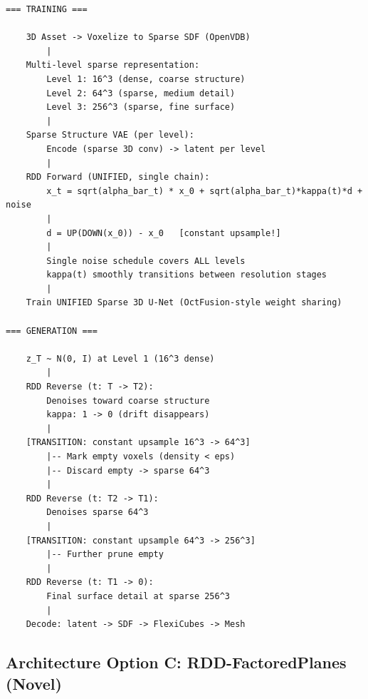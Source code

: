 \documentclass[11pt, a4paper]{article}
\begin{document}
\begin{lstlisting}[style=flowchart, caption={RDD-SparseVoxel Architecture}]
=== TRAINING ===

    3D Asset -> Voxelize to Sparse SDF (OpenVDB)
        |
    Multi-level sparse representation:
        Level 1: 16^3 (dense, coarse structure)
        Level 2: 64^3 (sparse, medium detail)
        Level 3: 256^3 (sparse, fine surface)
        |
    Sparse Structure VAE (per level):
        Encode (sparse 3D conv) -> latent per level
        |
    RDD Forward (UNIFIED, single chain):
        x_t = sqrt(alpha_bar_t) * x_0 + sqrt(alpha_bar_t)*kappa(t)*d + noise
        |
        d = UP(DOWN(x_0)) - x_0   [constant upsample!]
        |
        Single noise schedule covers ALL levels
        kappa(t) smoothly transitions between resolution stages
        |
    Train UNIFIED Sparse 3D U-Net (OctFusion-style weight sharing)

=== GENERATION ===

    z_T ~ N(0, I) at Level 1 (16^3 dense)
        |
    RDD Reverse (t: T -> T2):
        Denoises toward coarse structure
        kappa: 1 -> 0 (drift disappears)
        |
    [TRANSITION: constant upsample 16^3 -> 64^3]
        |-- Mark empty voxels (density < eps)
        |-- Discard empty -> sparse 64^3
        |
    RDD Reverse (t: T2 -> T1):
        Denoises sparse 64^3
        |
    [TRANSITION: constant upsample 64^3 -> 256^3]
        |-- Further prune empty
        |
    RDD Reverse (t: T1 -> 0):
        Final surface detail at sparse 256^3
        |
    Decode: latent -> SDF -> FlexiCubes -> Mesh
\end{lstlisting}

\subsection{Architecture Option C: RDD-FactoredPlanes (Novel)}
\end{document}
